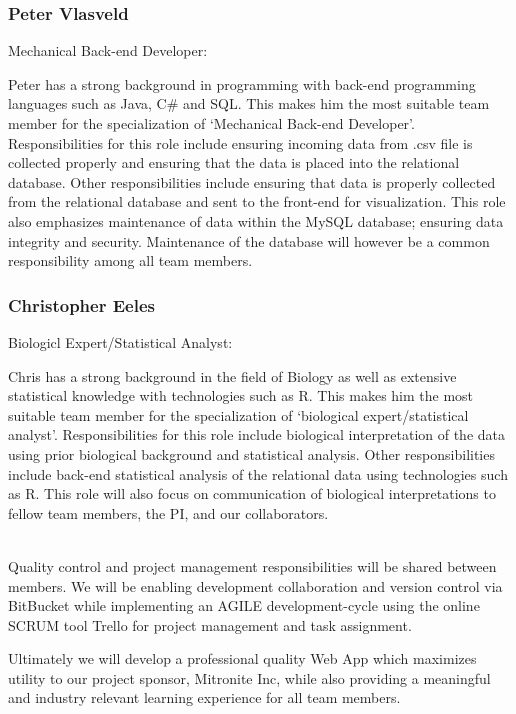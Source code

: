 \documentclass[10pt,twocolumn,letterpaper]{article}
\begin{document}
                \subsubsection*{Peter Vlasveld}

                Mechanical Back-end Developer:

		Peter has a strong background in programming with back-end programming languages such as Java, C# and SQL.
		This makes him the most suitable team member for the specialization of `Mechanical Back-end Developer'.
		Responsibilities for this role include ensuring incoming data from .csv file is collected properly and ensuring that the data is placed into 
		the relational database.
		Other responsibilities include ensuring that data is properly collected from the relational database and sent to the front-end for visualization.
		This role also emphasizes maintenance of data within the MySQL database; ensuring data integrity and security.
		Maintenance of the database will however be a common responsibility among all team members.

                \subsubsection*{Christopher Eeles}

                Biologicl Expert/Statistical Analyst:
		
		Chris has a strong background in the field of Biology as well as extensive statistical knowledge with technologies such as R.
		This makes him the most suitable team member for the specialization of `biological expert/statistical analyst'.
		Responsibilities for this role include biological interpretation of the data using prior biological background and statistical analysis.
		Other responsibilities include back-end statistical analysis of the relational data using technologies such as R.
		This role will also focus on communication of biological interpretations to fellow team members, the PI, and our collaborators.
		
		\\

            	Quality control and project management responsibilities will be shared between members. 
		We will be enabling development collaboration and version control via BitBucket while implementing an 
		AGILE development-cycle using the online SCRUM tool Trello for project management and task assignment.

            	Ultimately we will develop a professional quality Web App which maximizes utility to our project sponsor, 
		Mitronite Inc, while also providing a meaningful and industry relevant learning experience for all team members.
\end{document}
